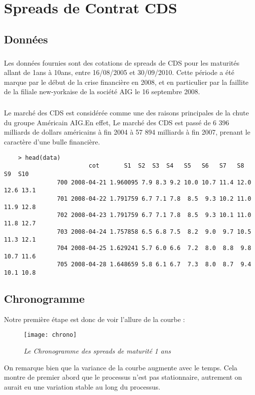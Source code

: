 \section{Spreads de Contrat CDS} 
\subsection{Données}
    \subparagraph{} Les données fournies sont des cotations de spreads de CDS pour les maturités
    allant de 1ans à 10ans, entre 16/08/2005 et
    30/09/2010. 
    Cette période a été marque par le début de la crise financière en 2008, et en
    particulier par la faillite de la filiale new-yorkaise de la société AIG le 16
    septembre 2008. 
    \subparagraph{}
    Le marché des CDS est considérée comme une des raisons principales de la chute
    du groupe Américain AIG.En effet, Le marché des CDS est passé de 6 396 milliards de dollars
    américains à fin 2004 à 57 894 milliards à fin 2007, prenant le caractère d'une
    bulle financière.

    
    \begin{verbatim}
    > head(data)
                        cot       S1  S2  S3  S4   S5   S6   S7   S8   S9  S10
               700 2008-04-21 1.960095 7.9 8.3 9.2 10.0 10.7 11.4 12.0 12.6 13.1
               701 2008-04-22 1.791759 6.7 7.1 7.8  8.5  9.3 10.2 11.0 11.9 12.8
               702 2008-04-23 1.791759 6.7 7.1 7.8  8.5  9.3 10.1 11.0 11.8 12.7
               703 2008-04-24 1.757858 6.5 6.8 7.5  8.2  9.0  9.7 10.5 11.3 12.1
               704 2008-04-25 1.629241 5.7 6.0 6.6  7.2  8.0  8.8  9.8 10.7 11.6
               705 2008-04-28 1.648659 5.8 6.1 6.7  7.3  8.0  8.7  9.4 10.1 10.8
    \end{verbatim}

    \subsection{Chronogramme} 
    Notre première étape est donc de voir l'allure de la courbe :
    \begin{figure}[H]
        \centering
        \label{fig:chrono} 
        \texttt{[image: chrono]} 
        \caption{\it Le Chronogramme des spreads de maturité 1 ans } 
    \end{figure}

    On remarque bien que la variance de la courbe augmente avec le temps. Cela
    montre de premier abord que le processus n'est pas stationnaire, autrement
    on aurait eu une variation stable au long du processus.

